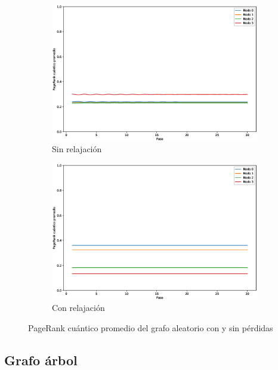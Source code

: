 \begin{figure}[H]
    \centering
    \begin{subfigure}[m]{0.45\textwidth}
        \centering
        \includegraphics[width=0.9\linewidth]{img/crown-mean-lossless.eps}
        \caption{Sin relajación}
    \end{subfigure}
    \begin{subfigure}[m]{0.45\textwidth}
        \centering
        \includegraphics[width=0.9\linewidth]{img/crown-mean-lossy.eps}
        \caption{Con relajación}
    \end{subfigure}
    \caption[PageRank cuántico promedio del grafo aleatorio con y sin pérdidas]{PageRank cuántico promedio del grafo aleatorio con y sin pérdidas}
    \label{fig:meancrownlossy}
\end{figure}

\subsection{Grafo árbol}


